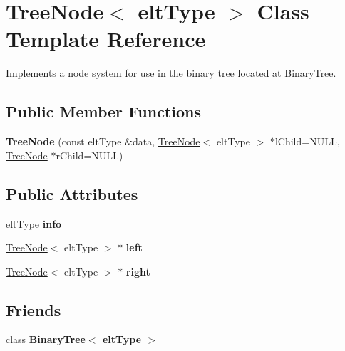 \hypertarget{classTreeNode}{\section{Tree\-Node$<$ elt\-Type $>$ Class Template Reference}
\label{classTreeNode}
}


Implements a node system for use in the binary tree located at \hyperlink{classBinaryTree}{Binary\-Tree}.  


\subsection*{Public Member Functions}
\begin{DoxyCompactItemize}
\item 
\hypertarget{classTreeNode_a3595f0674593914acb2ed0feec36de03}{{\bfseries Tree\-Node} (const elt\-Type \&data, \hyperlink{classTreeNode}{Tree\-Node}$<$ elt\-Type $>$ $\ast$l\-Child=N\-U\-L\-L, \hyperlink{classTreeNode}{Tree\-Node} $\ast$r\-Child=N\-U\-L\-L)}\label{classTreeNode_a3595f0674593914acb2ed0feec36de03}

\end{DoxyCompactItemize}
\subsection*{Public Attributes}
\begin{DoxyCompactItemize}
\item 
\hypertarget{classTreeNode_a301b2e909375953619844944532a3952}{elt\-Type {\bfseries info}}\label{classTreeNode_a301b2e909375953619844944532a3952}

\item 
\hypertarget{classTreeNode_ab9b72e3a55181dd966a2317323181106}{\hyperlink{classTreeNode}{Tree\-Node}$<$ elt\-Type $>$ $\ast$ {\bfseries left}}\label{classTreeNode_ab9b72e3a55181dd966a2317323181106}

\item 
\hypertarget{classTreeNode_a155337c4a615a9a80fe951bd295ec996}{\hyperlink{classTreeNode}{Tree\-Node}$<$ elt\-Type $>$ $\ast$ {\bfseries right}}\label{classTreeNode_a155337c4a615a9a80fe951bd295ec996}

\end{DoxyCompactItemize}
\subsection*{Friends}
\begin{DoxyCompactItemize}
\item 
\hypertarget{classTreeNode_a242cd44fb1555200321ae2ab92ec68a6}{class {\bfseries Binary\-Tree$<$ elt\-Type $>$}}\label{classTreeNode_a242cd44fb1555200321ae2ab92ec68a6}

\end{DoxyCompactItemize}


